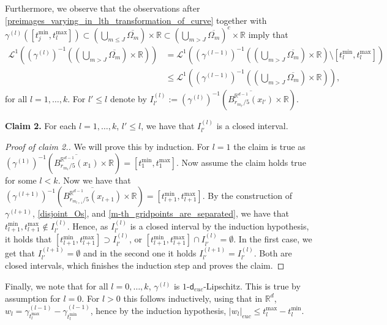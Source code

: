 \documentclass[a4paper,10pt]{article}
\numberwithin{equation}{section}
\newcommand{\R}{\mathbb{R}}
\newcommand{\sfd}{\mathsf d}
\begin{document}
Furthermore, we observe that the observations after \eqref{preimages_varying_in_lth_transformation_of_curve} together with $\gamma^{(l)}([t_j^{\min}, t_l^{\max}]) \subset (\bigcup_{m\leq J}\overline{\Omega_m})\times \R \subset (\bigcup_{m> J}\overline{\Omega_m})^c\times \R$ imply that 
\begin{align}\label{small_measure_preimage_of_O_m_large_m}
    \mathcal{L}^1((\gamma^{(l)})^{-1}((\bigcup_{m>J }\overline{\Omega_m})\times \R)) &= \mathcal{L}^1((\gamma^{(l-1)})^{-1}((\bigcup_{m>J }\overline{\Omega_m})\times \R)\setminus [t_l^{\min}, t_l^{\max}]) \nonumber\\
    & \leq  \mathcal{L}^1((\gamma^{(l-1)})^{-1}((\bigcup_{m>J}\overline{\Omega_m})\times \R)),
\end{align}
for all $l =1, \ldots, k$.  For $l' \leq l$ denote by $I^{(l)}_{l'}:= (\gamma^{(l)})^{-1}(\overline{B^{\R^{d-1}}_{r_{m_{l'}}/5}(x_{l'})}\times \R)$.

\textbf{Claim 2.} For each $l=1, \ldots, k$, $l' \leq l$, we have that  $I^{(l)}_{l'}$ is a closed interval.
\begin{proof}[Proof of claim 2.]
We will prove this by induction. For $l=1$ the claim is true as $(\gamma^{(1)})^{-1}(\overline{B^{\R^{d-1}}_{r_{m_{1}}/5}(x_{1})}\times \R)= [t_1^{\min}, t_1^{\max}]$. Now assume the claim holds true for some $l <k$. 
Now we have that $(\gamma^{(l+1)})^{-1}(\overline{B^{\R^{d-1}}_{r_{m_{l+1}}/5}(x_{l+1})}\times \R)= [t_{l+1}^{\min}, t_{l+1}^{\max}]$. 
By the construction of $\gamma^{(l+1)}$, \eqref{disjoint_Os}, and \eqref{m-th_gridpoints_are_separated}, we have that $t_{l+1}^{\min}, t_{l+1}^{\max} \notin I^{(l)}_{l'}$.
Hence, as $I^{(l)}_{l'}$ is a closed interval by the induction hypothesis, it holds that $[t_{l+1}^{\min}, t_{l+1}^{\max}] \supset I^{(l)}_{l'}$, or  $[t_{l+1}^{\min}, t_{l+1}^{\max}] \cap I^{(l)}_{l'} = \emptyset$. 
In the first case, we get that $I^{(l+1)}_{l'} = \emptyset$ and in the second one it holds $I^{(l+1)}_{l'} = I^{(l)}_{l'} $. Both are closed intervals, which finishes the induction step and proves the claim.
\end{proof} 

Finally, we note that for all $l=0, \ldots, k$, $\gamma^{(l)}$ is $1$-$\sfd_{euc}$-Lipschitz. This is true by assumption for $l=0$. For $l >0$ this follows inductively, using that in $\R^d$, $w_l = \gamma^{(l-1)}_{t^{\max}_l}- \gamma^{(l-1)}_{t^{\min}_l}$, hence by the induction hypothesis, $|w_l|_{euc} \leq t^{\max}_l-t^{\min}_l$. 
\end{document}
